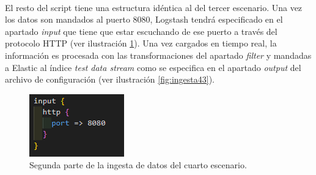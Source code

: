 \paragraph{}
\paragraph{}
\paragraph{}
\paragraph{}
\paragraph{}
\paragraph{}
\paragraph{}
\paragraph{}



El resto del script tiene una estructura idéntica al del tercer escenario. Una vez los datos son mandados al puerto 8080, Logstash tendrá especificado en el apartado \textit{input} que tiene que estar escuchando de ese puerto a través del protocolo HTTP  (ver ilustración  \ref{fig:ingesta42}). Una vez cargados en tiempo real, la información es procesada con las transformaciones del apartado \textit{filter} y mandadas a Elastic al índice \textit{test data stream} como se especifica en el apartado \textit{output} del archivo de configuración  (ver ilustración  \ref{fig:ingesta43}).  

\begin{figure}
    \centering
    \includegraphics[width=1\linewidth]{img/ingesta42.png}
    \caption{Segunda parte de la ingesta de datos del cuarto escenario.}
    \label{fig:ingesta42}
\end{figure}

